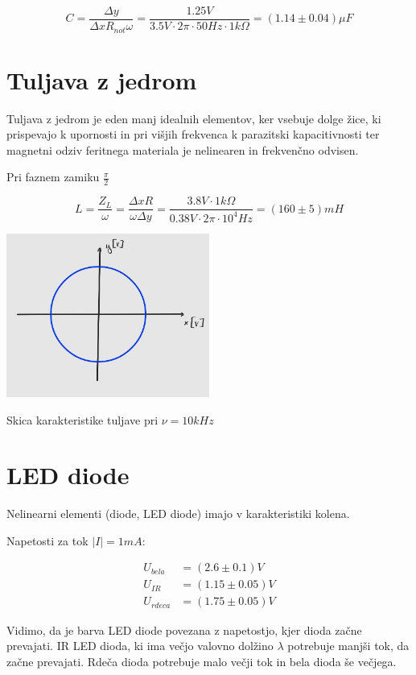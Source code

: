 \documentclass[12pt]{report}
\begin{document}
\[
 C = \frac{\Delta y}{\Delta x R_{not} \omega} = \frac{1.25\si{V}}{3.5\si{V}\cdot 2\pi \cdot 50\si{Hz} \cdot 1k\Omega} = (1.14 \pm 0.04)\mu \si{F}
\]

\section*{Tuljava z jedrom}

Tuljava z jedrom je eden manj idealnih elementov, ker vsebuje dolge žice, ki prispevajo k upornosti in pri višjih frekvenca k parazitski kapacitivnosti ter magnetni odziv feritnega materiala je nelinearen in frekvenčno odvisen. 

Pri faznem zamiku $\frac{\pi}{2}$

\[
  L = \frac{Z_L}{\omega} = \frac{\Delta x R}{\omega \Delta y} = \frac{3.8\si{V} \cdot 1k\Omega}{0.38\si{V} \cdot 2\pi \cdot 10^4\si{Hz}} = (160 \pm 5) \si{mH}
\]

\begin{slika}[H]
  \centering
  \includegraphics[width=0.5\textwidth]{tuljava}
  \caption{\small Skica karakteristike tuljave pri $\nu = 10\si{kHz}$}
\end{slika}

\section*{LED diode}

Nelinearni elementi (diode, LED diode) imajo v karakteristiki kolena. 

Napetosti za tok $|I| = 1\si{mA}$:

\begin{align*}
  U_{bela} &= (2.6 \pm 0.1)\si{V} \\
  U_{IR} &= (1.15 \pm 0.05)\si{V} \\ 
  U_{rdeca} &= (1.75 \pm 0.05)\si{V}
\end{align*}

Vidimo, da je barva LED diode povezana z napetostjo, kjer dioda začne prevajati. IR LED dioda, ki ima večjo valovno dolžino $\lambda$ potrebuje manjši tok, da začne prevajati. Rdeča dioda potrebuje malo večji tok in bela dioda še večjega.
\end{document}
